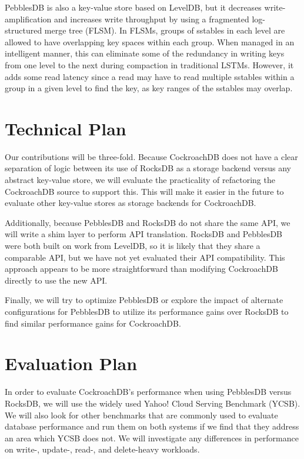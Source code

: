 \documentclass[10pt,twocolumn,letterpaper]{article}
\begin{document}
PebblesDB is also a key-value store based on LevelDB, but it decreases
write-amplification and increases write throughput by using a fragmented
log-structured merge tree (FLSM). In FLSMs, groups of sstables in each level
are allowed to have overlapping key spaces within each group. When managed in
an intelligent manner, this can eliminate some of the redundancy in writing
keys from one level to the next during compaction in traditional LSTMs.
However, it adds some read latency since a read may have to read multiple
sstables within a group in a given level to find the key, as key ranges of the
sstables may overlap.


\section{Technical Plan}
Our contributions will be three-fold. Because CockroachDB does not have a clear
separation of logic between its use of RocksDB as a storage backend versus any
abstract key-value store, we will evaluate the practicality of refactoring the
CockroachDB source to support this. This will make it easier in the future to
evaluate other key-value stores as storage backends for CockroachDB.

Additionally, because PebblesDB and RocksDB do not share the same API, we will
write a shim layer to perform API translation. RocksDB and PebblesDB were both
built on work from LevelDB, so it is likely that they share a comparable API,
but we have not yet evaluated their API compatibility.  This approach appears
to be more straightforward than modifying CockroachDB directly to use the new
API.

Finally, we will try to optimize PebblesDB or explore the impact of alternate
configurations for PebblesDB to utilize its performance gains over RocksDB to
find similar performance gains for CockroachDB.


\section{Evaluation Plan}
In order to evaluate CockroachDB's performance when using PebblesDB versus
RocksDB, we will use the widely used Yahoo! Cloud Serving Benchmark (YCSB). We
will also look for other benchmarks that are commonly used to evaluate database
performance and run them on both systems if we find that they address an area
which YCSB does not. We will investigate any differences in performance on
write-, update-, read-, and delete-heavy workloads.
\end{document}
